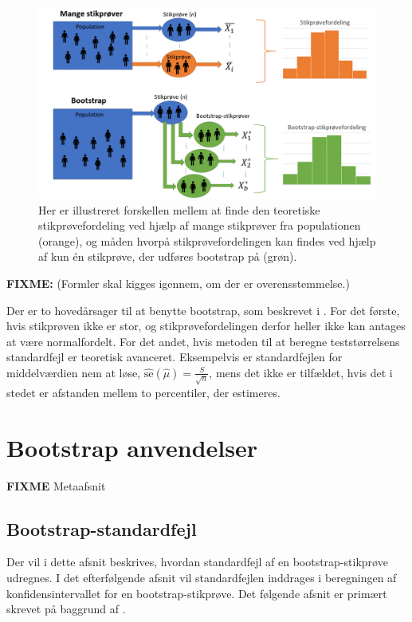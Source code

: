 \documentclass[
]{book}
\theoremstyle{definition}
\theoremstyle{definition}
\theoremstyle{definition}
\theoremstyle{remark}
\begin{document}
\begin{figure}

{\centering \includegraphics[width=0.75\linewidth]{images/normalvboot} 

}

\caption{Her er illustreret forskellen mellem at finde den teoretiske stikprøvefordeling ved hjælp af mange stikprøver fra populationen (orange), og måden hvorpå stikprøvefordelingen kan findes ved hjælp af kun én stikprøve, der udføres bootstrap på (grøn).}\label{fig:figur-Bootstrap-illustration}
\end{figure}

\textbf{FIXME:} (Formler skal kigges igennem, om der er overensstemmelse.)

Der er to hovedårsager til at benytte bootstrap, som beskrevet i \citep{BootYouTube1}. For det første, hvis stikprøven ikke er stor, og stikprøvefordelingen derfor heller ikke kan antages at være normalfordelt. For det andet, hvis metoden til at beregne teststørrelsens standardfejl er teoretisk avanceret. Eksempelvis er standardfejlen for middelværdien nem at løse, \(\hat{\text{se}}(\hat{\mu}) = \frac{S}{\sqrt{n}}\), mens det ikke er tilfældet, hvis det i stedet er afstanden mellem to percentiler, der estimeres.

\hypertarget{bootstrap-anvendelser}{%
\chapter{Bootstrap anvendelser}\label{bootstrap-anvendelser}}

\textbf{FIXME} Metaafsnit

\hypertarget{bootstrap-standardfejl}{%
\section{Bootstrap-standardfejl}\label{bootstrap-standardfejl}}

Der vil i dette afsnit beskrives, hvordan standardfejl af en bootstrap-stikprøve udregnes. I det efterfølgende afsnit vil standardfejlen inddrages i beregningen af konfidensintervallet for en bootstrap-stikprøve. Det følgende afsnit er primært skrevet på baggrund af \citep{TDSBootstrap}.
\end{document}
